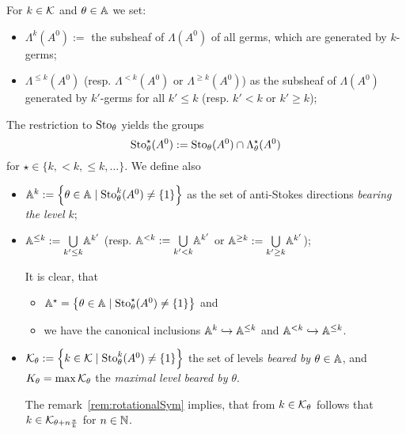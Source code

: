 \begin{notations}
  For $k\in\mathcal{K}$ and $\theta\in\mathbb{A}$ we set:
  \begin{itemize}
    \item $\Lambda^{k}(A^0):=$ the subsheaf of $\Lambda(A^0)$ of all germs,
      which are generated by $k$-germs;
    \item $\Lambda^{\leq k}(A^0)$ (resp. $\Lambda^{<k}(A^0)$ or
      $\Lambda^{\geq k}(A^0)$) as the subsheaf of $\Lambda(A^0)$ generated by
      $k'$-germs for all $k'\leq k$ (resp. $k'<k$ or $k'\geq k$);
  \end{itemize}
  The restriction to $\operatorname{Sto}_\theta$ yields the groups
  \[
    \operatorname{Sto}_\theta^\star(A^0):=\operatorname{Sto}_\theta(A^0)\cap\Lambda_\theta^{\star}(A^0)
  \]
  for $\star\in\{k,<k,\leq k,\dots\}$.
  We define also
  \begin{itemize}
    \item $\mathbb{A}^k:=\left\{\theta\in\mathbb{A}\mid\operatorname{Sto}_\theta^k(A^0)\neq\{1\}\right\}$ as
      the set of anti-Stokes directions \emph{bearing the level $k$};
    \item $\mathbb{A}^{\leq k}:=\underset{k'\leq k}\bigcup\mathbb{A}^{k'}$ (resp.
      $\mathbb{A}^{<k}:=\underset{k'<k}\bigcup\mathbb{A}^{k'}$ or
      $\mathbb{A}^{\geq k}:=\underset{k'\geq k}\bigcup\mathbb{A}^{k'}$);
      \begin{s-rem}
        It is clear, that
        \begin{itemize}
          \item $\mathbb{A}^{\star}=\left\{\theta\in\mathbb{A}
            \mid\operatorname{Sto}_{\theta}^\star(A^0)\neq\{1\}\right\}$ and
          \item we have the canonical inclusions
            $\mathbb{A}^k\hookrightarrow\mathbb{A}^{\leq k}$ and
            $\mathbb{A}^{<k}\hookrightarrow\mathbb{A}^{\leq k}$.
        \end{itemize}
      \end{s-rem}
    \item $\mathcal{K}_\theta:=\left\{k\in\mathcal{K}\mid\operatorname{Sto}_\theta^k(A^0)\neq\{1\}\right\}$
      the set of levels \emph{beared by $\theta\in\mathbb{A}$}, and
      $K_\theta=\max\mathcal{K}_\theta$ the \emph{maximal level beared by $\theta$}.
      \begin{s-rem}
        The remark~\ref{rem:rotationalSym} implies, that from $k\in\mathcal{K}_{\theta}$
        follows that $k\in\mathcal{K}_{\theta+n\frac{\pi}{k}}$ for $n\in\mathbb{N}$.
      \end{s-rem}
  \end{itemize}
\end{notations}

